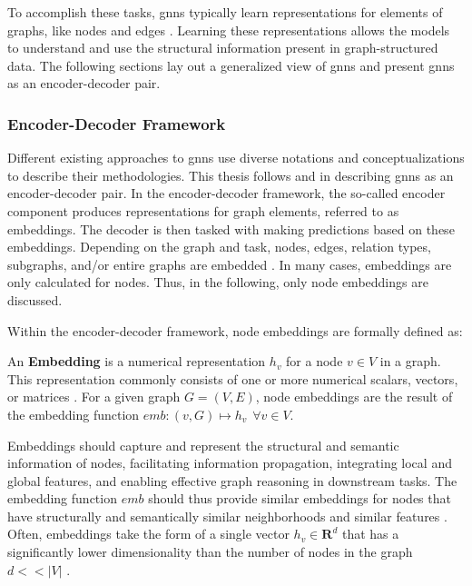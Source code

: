 To accomplish these tasks, \glspl{gnn} typically learn representations for elements of graphs, like nodes and edges \cite{zhou_graph_2020}. Learning these representations allows the models to understand and use the structural information present in graph-structured data. The following sections lay out a generalized view of \glspl{gnn} and present \glspl{gnn} as an encoder-decoder pair.

\subsubsection{Encoder-Decoder Framework}
\label{s_Background_GNNs_EncoderDecoderFramework}

Different existing approaches to \glspl{gnn} use diverse notations and conceptualizations to describe their methodologies. This thesis follows \cite{hamilton_representation_2017} and \cite{kazemi_representation_2019} in describing \glspl{gnn} as an encoder-decoder pair.
In the encoder-decoder framework, the so-called encoder component produces representations for graph elements, referred to as embeddings. The decoder is then tasked with making predictions based on these embeddings. Depending on the graph and task, nodes, edges, relation types, subgraphs, and/or entire graphs are embedded \cite{barros_survey_2023}. In many cases, embeddings are only calculated for nodes. Thus, in the following, only node embeddings are discussed.

Within the encoder-decoder framework, node embeddings are formally defined as: 

\begin{definition}
    \label{d_Embedding}
    An \textbf{Embedding} is a numerical representation $h_v$ for a node $v \in V$ in a graph. This representation commonly consists of one or more numerical scalars, vectors, or matrices \cite{kazemi_representation_2019}. For a given graph $G = (V, E)$, node embeddings are the result of the embedding function $emb: (v, G) \mapsto h_v \hspace{5pt} \forall v \in V$.
\end{definition}

Embeddings should capture and represent the structural and semantic information of nodes, facilitating information propagation, integrating local and global features, and enabling effective graph reasoning in downstream tasks\cite{goyal_graph_2018}. The embedding function $emb$ should thus provide similar embeddings for nodes that have structurally and semantically similar neighborhoods and similar features \cite{goyal_graph_2018, bronstein_geometric_2021}.
Often, embeddings take the form of a single vector $h_v \in \mathbf{R}^d$ that has a significantly lower dimensionality than the number of nodes in the graph $d<<|V|$ \cite{goyal_graph_2018}.

